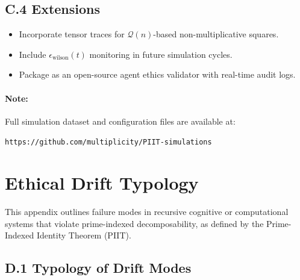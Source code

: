 \documentclass[12]{amsart}
\theoremstyle{plain}
\begin{document}
\subsection*{C.4 Extensions}

\begin{itemize}
  \item Incorporate tensor traces for $\mathcal{Q}(n)$-based non-multiplicative squares.
  \item Include $\epsilon_{\text{wilson}}(t)$ monitoring in future simulation cycles.
  \item Package as an open-source agent ethics validator with real-time audit logs.
\end{itemize}

\paragraph{Note:} Full simulation dataset and configuration files are available at:

\texttt{https://github.com/multiplicity/PIIT-simulations}

\clearpage
\section{Ethical Drift Typology}

This appendix outlines failure modes in recursive cognitive or computational systems that violate prime-indexed decomposability, as defined by the Prime-Indexed Identity Theorem (PIIT).

\subsection*{D.1 Typology of Drift Modes}
\end{document}
